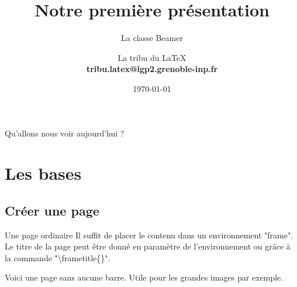 \documentclass[8pt]{beamer}
\title[Première présentation]{Notre première présentation}
\subtitle{La classe Beamer}
\author[Groupe LaTeX]{La tribu du LaTeX\\%
	\textbf{tribu.latex@lgp2.grenoble-inp.fr}}
\date{\today}
\institute[LGP2 - Grenoble INP]{Laboratoire LGP2 - Grenoble INP}
\begin{document}

\begin{frame}
	\maketitle
\end{frame}

\begin{frame}{Qu'allons nous voir aujourd'hui ?}
	\tableofcontents
\end{frame}

\section{Les bases}
	\begin{frame}
		\tableofcontents[currentsection]
	\end{frame}
\subsection{Créer une page}
	\begin{frame}{Une page ordinaire}\centering
		Il suffit de placer le contenu dans un environnement "frame".\vspace{2em}\\
		Le titre de la page peut être donné en paramètre de l'environnement ou grâce à la commande "\textbackslash frametitle\{\}".
	\end{frame}
	\begin{frame}[plain]\centering
		Voici une page sans aucune barre. Utile pour les grandes images par exemple.
	\end{frame}
\end{document}
